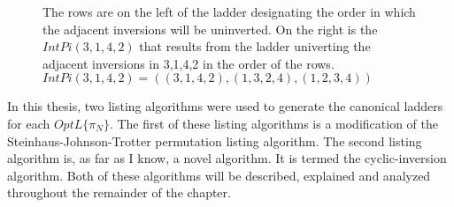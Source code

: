 \begin{figure}[!htp]
    \begin{center}
    \end{center}
    \caption{The rows are on the left of the ladder designating the order in which the adjacent inversions will be uninverted.
    On the right is the $IntPi(3,1,4,2)$ that results from the ladder univerting  the adjacent inversions in 3,1,4,2 in the order 
    of the rows. $IntPi(3,1,4,2)=((3,1,4,2), (1,3,2,4), (1,2,3,4))$}
\end{figure}

In this thesis, two listing algorithms were used to generate the canonical 
ladders for each $OptL\{\pi_{N}\}$. The first of these listing algorithms 
is a modification of the Steinhaus-Johnson-Trotter permutation listing algorithm. 
The second listing algorithm is, as far as I know, a novel algorithm. 
It is termed the cyclic-inversion algorithm. Both of these algorithms will 
be described, explained and analyzed throughout the remainder of the chapter.\par

